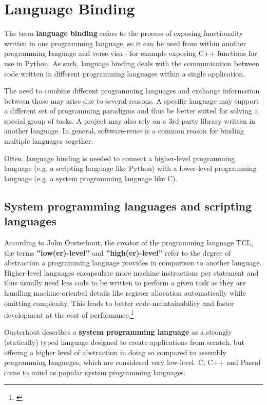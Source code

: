 \chapter{Language Binding}

The term \textbf{language binding} refers to the process of exposing functionality written in one programming language, so it can be used from within another programming language and verse visa - for example exposing C++ functions for use in Python. As such, language binding deals with the communication between code written in different programming languages within a single application.

The need to combine different programming languages and exchange information between those may arise due to several reasons. A specific language may support a different set of programming paradigms and thus be better suited for solving a special group of tasks. A project may also rely on a 3rd party library written in another language. In general, software-reuse is a common reason for binding multiple languages together.

Often, language binding is needed to connect a higher-level programming language (e.g. a scripting language like Python) with a lower-level programming language (e.g. a system programming language like C).

\section{System programming languages and scripting languages}

According to John Ousterhout, the creator of the programming language TCL, the terms \textbf{''low(er)-level''} and \textbf{''high(er)-level''} refer to the degree of abstraction a programming language provides in comparison to another language. Higher-level languages encapsulate more machine instructions per statement and thus usually need less code to be written to perform a given task as they are handling machine-oriented details like register allocation automatically while omitting complexity. This leads to better code-maintainability and faster development at the cost of performance.\footnote{\citep{Ousterhout}}

Ousterhout describes a \textbf{system programming language} as a strongly (statically) typed language designed to create applications from scratch, but offering a higher level of abstraction in doing so compared to assembly programming languages, which are considered very low-level. C, C++ and Pascal come to mind as popular system programming languages.

